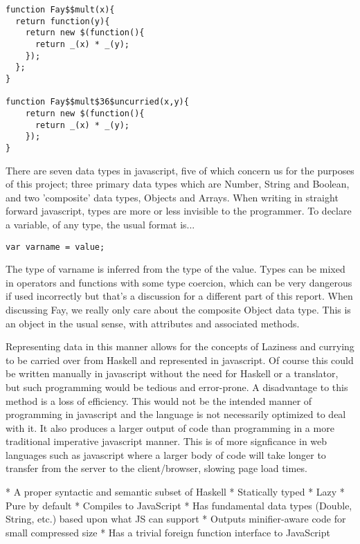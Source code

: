 \documentclass[11pt]{article}
\begin{document}
\begin{verbatim}
function Fay$$mult(x){
  return function(y){
    return new $(function(){
      return _(x) * _(y);
    });
  };
}

function Fay$$mult$36$uncurried(x,y){
    return new $(function(){
      return _(x) * _(y);
    });
}
\end{verbatim}



There are seven data types in javascript, five of which concern us for the purposes
of this project; three primary data types which are Number, String and Boolean, 
and two 'composite' data types, Objects and Arrays. When writing in straight
forward javascript, types are more or less invisible to the programmer. To declare
a variable, of any type, the usual format is...
\begin{verbatim}
var varname = value;
\end{verbatim}
The type of varname is inferred from the type of the value. Types can be mixed
in operators and functions with some type coercion, which can be very dangerous
if used incorrectly but that's a discussion for a different part of this report.
When discussing Fay, we really only care about the composite Object data type. 
This is an object in the usual sense, with attributes and associated methods. 

Representing data in this manner allows for the concepts of Laziness and currying
to be carried over from Haskell and represented in javascript. Of course this could
be written manually in javascript without the need for Haskell or a translator, but
such programming would be tedious and error-prone. A disadvantage to this method is a 
loss of efficiency. This would not be the intended manner of programming in
javascript and the language is not necessarily optimized to deal with it. It
also produces a larger output of code than programming in a more traditional 
imperative javascript manner. This is of more signficance in web languages
such as javascript where a larger body of code will take longer to transfer
from the server to the client/browser, slowing page load times. 



* A proper syntactic and semantic subset of Haskell
* Statically typed
* Lazy
* Pure by default
* Compiles to JavaScript
* Has fundamental data types (Double, String, etc.) based upon what JS can support
* Outputs minifier-aware code for small compressed size
* Has a trivial foreign function interface to JavaScript
\end{document}
